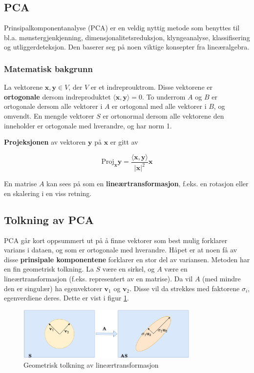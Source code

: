 \subsection{PCA}
Prinsipalkomponentanalyse (PCA) er en veldig nyttig metode som benyttes til bl.a. mønstergjenkjenning, dimensjonalitetsreduksjon, klyngeanalyse, klassifisering og utliggerdeteksjon. Den baserer seg på noen viktige konsepter fra lineæralgebra.

\subsubsection{Matematisk bakgrunn}

La vektorene $\mathbf{x}, \mathbf{y} \in V$, der $V$ er et indreprouktrom. Disse vektorene er \textbf{ortogonale} dersom indreproduktet $\langle \mathbf{x}, \mathbf{y} \rangle = 0$. To underrom $A$ og $B$ er ortogonale dersom alle vektorer i $A$ er ortogonal med alle vektorer i $B$, og omvendt. En mengde vektorer $S$ er ortonormal dersom alle vektorene den inneholder er ortogonale med hverandre, og har norm 1.

\textbf{Projeksjonen} av vektoren $\mathbf{y}$ på $\mathbf{x}$ er gitt av

\begin{equation}
\textrm{Proj}_{\mathbf{x}} \mathbf{y} = \frac{\langle \mathbf{x}, \mathbf{y} \rangle}{|\mathbf{x}|^2}\mathbf{x}
	\label{eq_projection}
\end{equation}

En matrise $A$ kan sees på som en \textbf{lineærtransformasjon}, f.eks. en rotasjon eller en skalering i en viss retning.

\subsection{Tolkning av PCA}
PCA går kort oppsummert ut på å finne vektorer som best mulig forklarer varians i dataen, og som er ortogonale med hverandre. Håpet er at noen få av disse \textbf{prinsipale komponentene} forklarer en stor del av variansen. Metoden har en fin geometrisk tolkning. La $S$ være en sirkel, og $A$ være en lineærtransformasjon (f.eks. representert av en matrise). Da vil $A$ (med mindre den er singulær) ha egenvektorer $\mathbf{v}_1$ og $\mathbf{v}_2$. Disse vil da strekkes med faktorene $\sigma_i$, egenverdiene deres. Dette er vist i figur \ref{fig:pca_skvis}.

\begin{figure}[h]
	\centering
	\includegraphics[width=0.8\textwidth]{figurer/pca_skvis}
	\caption{Geometrisk tolkning av lineærtransformasjon}
	\label{fig:pca_skvis}
\end{figure}

